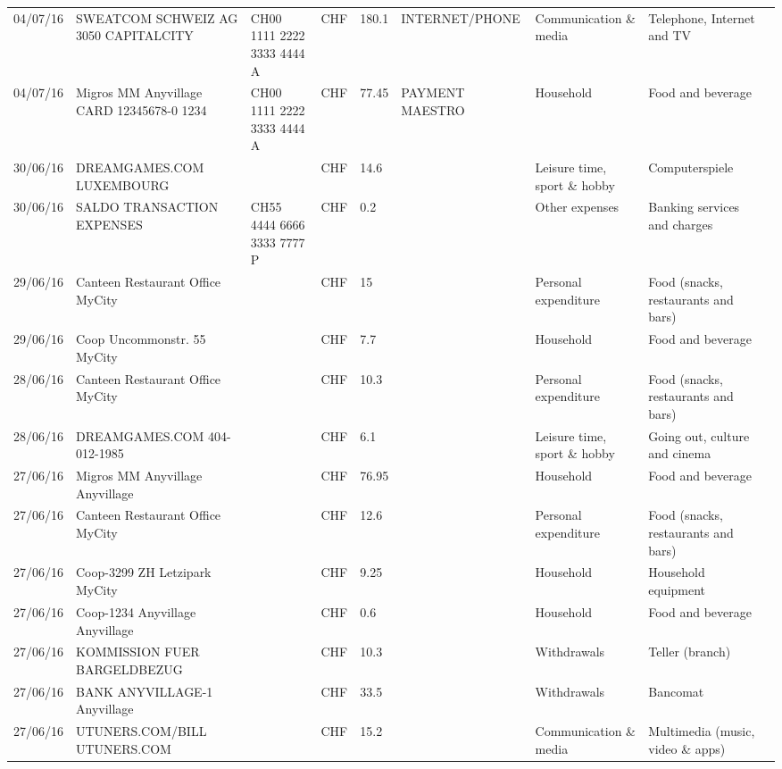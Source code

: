 \begin{landscape}
\begin{tiny}
\begin{longtable}{lp{4cm}llllp{3cm}ll}
		    04/07/16 & SWEATCOM SCHWEIZ AG 3050 CAPITALCITY & CH00 1111 2222 3333 4444 A & CHF   & 180.1 & INTERNET/PHONE & Communication \& media & Telephone,  Internet and TV \\
		    04/07/16 & Migros MM Anyvillage CARD 12345678-0 1234 & CH00 1111 2222 3333 4444 A & CHF   & 77.45 & PAYMENT MAESTRO & Household & Food and beverage \\
		    30/06/16 & DREAMGAMES.COM           LUXEMBOURG &       & CHF   & 14.6  &       & Leisure time, sport \& hobby & Computerspiele \\
		    30/06/16 & SALDO TRANSACTION EXPENSES & CH55 4444 6666 3333 7777 P & CHF   & 0.2   &       & Other expenses & Banking services and charges \\
		    29/06/16 & Canteen Restaurant Office      MyCity &       & CHF   & 15    &       & Personal expenditure & Food (snacks, restaurants and bars) \\
		    29/06/16 & Coop Uncommonstr. 55   MyCity &       & CHF   & 7.7   &       & Household & Food and beverage \\
		    28/06/16 & Canteen Restaurant Office      MyCity &       & CHF   & 10.3  &       & Personal expenditure & Food (snacks, restaurants and bars) \\
		    28/06/16 & DREAMGAMES.COM           404-012-1985 &       & CHF   & 6.1   &       & Leisure time, sport \& hobby & Going out, culture and cinema \\
		    27/06/16 & Migros MM Anyvillage    Anyvillage &       & CHF   & 76.95 &       & Household & Food and beverage \\
		    27/06/16 & Canteen Restaurant Office      MyCity &       & CHF   & 12.6  &       & Personal expenditure & Food (snacks, restaurants and bars) \\
		    27/06/16 & Coop-3299 ZH Letzipark   MyCity &       & CHF   & 9.25  &       & Household & Household equipment \\
		    27/06/16 & Coop-1234 Anyvillage    Anyvillage &       & CHF   & 0.6   &       & Household & Food and beverage \\
		    27/06/16 & KOMMISSION FUER BARGELDBEZUG &       & CHF   & 10.3  &       & Withdrawals & Teller (branch) \\
		    27/06/16 & BANK ANYVILLAGE-1        Anyvillage &       & CHF   & 33.5  &       & Withdrawals & Bancomat \\
		    27/06/16 & UTUNERS.COM/BILL          UTUNERS.COM &       & CHF   & 15.2  &       & Communication \& media & Multimedia (music, video \& apps) \\

\end{longtable}
\end{tiny}
\end{landscape}
